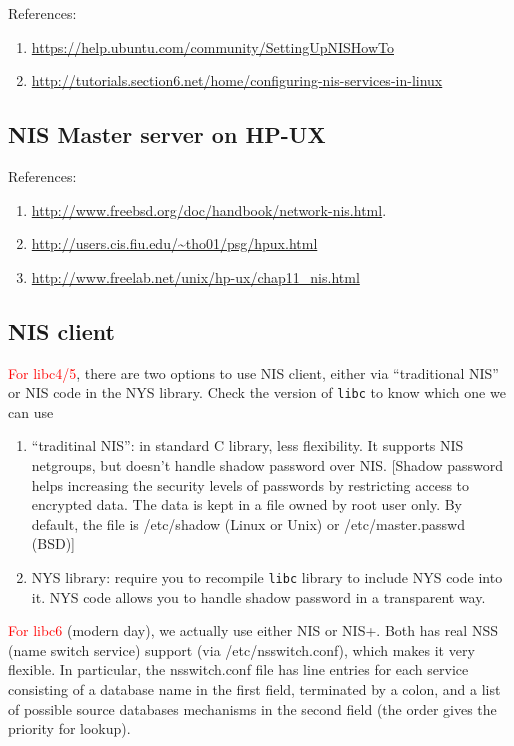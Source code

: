 References:
\begin{enumerate}
  \item \url{https://help.ubuntu.com/community/SettingUpNISHowTo}
  \item
  \url{http://tutorials.section6.net/home/configuring-nis-services-in-linux}
\end{enumerate}



\subsection{NIS Master server on HP-UX}

References:
\begin{enumerate}
  \item \url{http://www.freebsd.org/doc/handbook/network-nis.html}. 

  \item \url{http://users.cis.fiu.edu/~tho01/psg/hpux.html}

  \item \url{http://www.freelab.net/unix/hp-ux/chap11_nis.html}
\end{enumerate}

\subsection{NIS client}
\label{sec:NIS_client}

\textcolor{red}{For libc4/5}, there are two options to use NIS client, either
via ``traditional NIS'' or NIS code in the NYS library.  Check the version of
\verb!libc! to know which one we can use
\begin{enumerate}
  \item ``traditinal NIS'':  in standard C library, less flexibility. It
  supports NIS netgroups, but doesn't handle shadow password over NIS. [Shadow
  password helps increasing the security levels of passwords by restricting
  access to encrypted data. The data is kept in a file owned by root user only.
  By default, the file is /etc/shadow (Linux or Unix) or /etc/master.passwd
  (BSD)]
  
  \item NYS library: require you to recompile \verb!libc! library to include NYS
  code into it. NYS code allows you to handle shadow password in a transparent way. 
\end{enumerate}

\textcolor{red}{For libc6} (modern day), we actually use either NIS or NIS+.
Both has real NSS (name switch service) support (via /etc/nsswitch.conf), which
makes it very flexible. In particular, the nsswitch.conf file has line entries
for each service consisting of a database name in the first field, terminated by
a colon, and a list of possible source databases mechanisms in the second field
(the order gives the priority for lookup).

